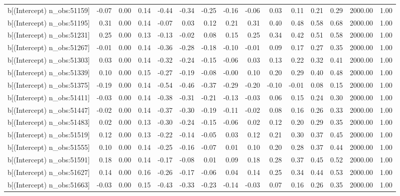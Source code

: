 \begin{table}[ht]
\begin{tabular}{rrrrrrrrrrrrrrr}
  b[(Intercept) n\_obs:51159] & -0.07 & 0.00 & 0.14 & -0.44 & -0.34 & -0.25 & -0.16 & -0.06 & 0.03 & 0.11 & 0.21 & 0.29 & 2000.00 & 1.00 \\ 
  b[(Intercept) n\_obs:51195] & 0.31 & 0.00 & 0.14 & -0.07 & 0.03 & 0.12 & 0.21 & 0.31 & 0.40 & 0.48 & 0.58 & 0.68 & 2000.00 & 1.00 \\ 
  b[(Intercept) n\_obs:51231] & 0.25 & 0.00 & 0.13 & -0.13 & -0.02 & 0.08 & 0.15 & 0.25 & 0.34 & 0.42 & 0.51 & 0.58 & 2000.00 & 1.00 \\ 
  b[(Intercept) n\_obs:51267] & -0.01 & 0.00 & 0.14 & -0.36 & -0.28 & -0.18 & -0.10 & -0.01 & 0.09 & 0.17 & 0.27 & 0.35 & 2000.00 & 1.00 \\ 
  b[(Intercept) n\_obs:51303] & 0.03 & 0.00 & 0.14 & -0.32 & -0.24 & -0.15 & -0.06 & 0.03 & 0.13 & 0.22 & 0.32 & 0.41 & 2000.00 & 1.00 \\ 
  b[(Intercept) n\_obs:51339] & 0.10 & 0.00 & 0.15 & -0.27 & -0.19 & -0.08 & -0.00 & 0.10 & 0.20 & 0.29 & 0.40 & 0.48 & 2000.00 & 1.00 \\ 
  b[(Intercept) n\_obs:51375] & -0.19 & 0.00 & 0.14 & -0.54 & -0.46 & -0.37 & -0.29 & -0.20 & -0.10 & -0.01 & 0.08 & 0.15 & 2000.00 & 1.00 \\ 
  b[(Intercept) n\_obs:51411] & -0.03 & 0.00 & 0.14 & -0.38 & -0.31 & -0.21 & -0.13 & -0.03 & 0.06 & 0.15 & 0.24 & 0.30 & 2000.00 & 1.00 \\ 
  b[(Intercept) n\_obs:51447] & -0.02 & 0.00 & 0.14 & -0.37 & -0.30 & -0.19 & -0.11 & -0.02 & 0.08 & 0.16 & 0.26 & 0.33 & 2000.00 & 1.00 \\ 
  b[(Intercept) n\_obs:51483] & 0.02 & 0.00 & 0.13 & -0.30 & -0.24 & -0.15 & -0.06 & 0.02 & 0.12 & 0.20 & 0.29 & 0.35 & 2000.00 & 1.00 \\ 
  b[(Intercept) n\_obs:51519] & 0.12 & 0.00 & 0.13 & -0.22 & -0.14 & -0.05 & 0.03 & 0.12 & 0.21 & 0.30 & 0.37 & 0.45 & 2000.00 & 1.00 \\ 
  b[(Intercept) n\_obs:51555] & 0.10 & 0.00 & 0.14 & -0.25 & -0.16 & -0.07 & 0.01 & 0.10 & 0.20 & 0.28 & 0.37 & 0.44 & 2000.00 & 1.00 \\ 
  b[(Intercept) n\_obs:51591] & 0.18 & 0.00 & 0.14 & -0.17 & -0.08 & 0.01 & 0.09 & 0.18 & 0.28 & 0.37 & 0.45 & 0.52 & 2000.00 & 1.00 \\ 
  b[(Intercept) n\_obs:51627] & 0.14 & 0.00 & 0.16 & -0.26 & -0.17 & -0.06 & 0.04 & 0.14 & 0.25 & 0.34 & 0.44 & 0.53 & 2000.00 & 1.00 \\ 
  b[(Intercept) n\_obs:51663] & -0.03 & 0.00 & 0.15 & -0.43 & -0.33 & -0.23 & -0.14 & -0.03 & 0.07 & 0.16 & 0.26 & 0.35 & 2000.00 & 1.00 \\ 

\end{tabular}
\end{table}
